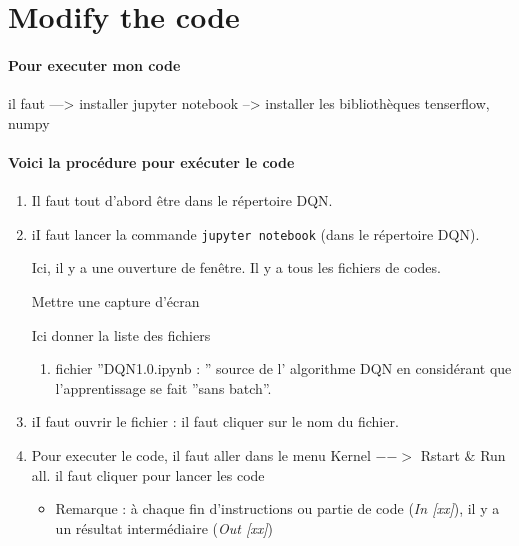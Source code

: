 \documentclass[a4paper,10pt]{article}
\begin{document}
\section{Modify the code}


\newpage

\paragraph{Pour  executer mon code}  il faut 
---> installer jupyter notebook
--> installer  les bibliothèques        tenserflow, numpy

\paragraph{Voici la procédure pour exécuter le code}

\begin{enumerate}
\item Il faut tout d'abord  être  dans le répertoire  DQN.
\item  iI faut lancer la commande \texttt{jupyter notebook}  (dans le répertoire  DQN).

Ici, il y a une ouverture de fenêtre. Il y a tous les fichiers de codes. 

Mettre une capture d'écran


Ici donner la liste des fichiers
\begin{enumerate}
\item fichier ''DQN1.0.ipynb : ''  source de l' algorithme DQN  en considérant que l'apprentissage se fait ''sans batch''.
\end{enumerate}

\item  iI faut ouvrir le fichier : il faut cliquer sur le nom du fichier.
\item  Pour executer le code, il faut aller dans le menu Kernel $-->$ Rstart $\&$ Run all. il faut cliquer pour lancer les code
\begin{itemize}
\item Remarque : à chaque  fin d'instructions ou partie de code (\emph{In [xx]}),  il y a un résultat intermédiaire  (\emph{Out [xx]})

\end{itemize}


 

\end{enumerate}

\clearpage


\end{document}
